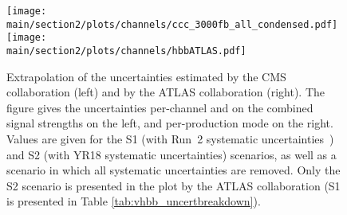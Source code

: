 \begin{figure}[h!]
\begin{center}
\texttt{[image: \\main/section2/plots/channels/ccc\_3000fb\_all\_condensed.pdf]}
\texttt{[image: \\main/section2/plots/channels/hbbATLAS.pdf]}
\end{center}
\caption{Extrapolation of the uncertainties estimated by the CMS collaboration (left) and by the ATLAS collaboration (right). The figure gives the uncertainties per-channel and on the combined signal strengths on the left, and per-production mode on the right. Values are given for the S1 (with Run~2 systematic uncertainties~\cite{HIG16044}) and S2 (with YR18 systematic uncertainties) scenarios, as well as a scenario in which all systematic uncertainties are removed. Only the S2 scenario is presented in the plot by the ATLAS collaboration (S1 is presented in Table \ref{tab:vhbb_uncertbreakdown}).}
\label{fig:vhbb_proj_bars}
\end{figure}
